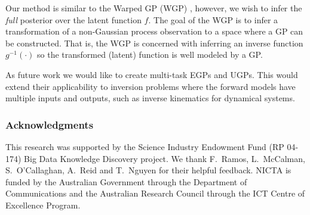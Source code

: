 \documentclass{article} %
\begin{document}
Our method is similar to the Warped GP (WGP) \cite{snelson2003warped}, however,
we wish to infer the \emph{full} posterior over the latent function $f$. The
goal of the WGP is to infer a transformation of a non-Gaussian process
observation to a space where a GP can be constructed. That is, the WGP is
concerned with inferring an inverse function $g^{-1}(\cdot)$ so the transformed
(latent) function is well modeled by a GP.

As future work we would like to create multi-task EGPs and UGPs. This would
extend their applicability to inversion problems where the forward models have
multiple inputs and outputs, such as inverse kinematics for dynamical systems.

\subsubsection*{Acknowledgments}
{
\small
This research was supported by the Science Industry Endowment Fund (RP 04-174)
Big Data Knowledge Discovery project. We thank F.\ Ramos, L.\ McCalman, 
S.\ O'Callaghan, A.\ Reid and T.\ Nguyen for 
their helpful feedback.
%
NICTA is funded by the Australian Government through the Department of
Communications and the Australian Research Council through the ICT Centre of
Excellence Program.
}



\end{document}
